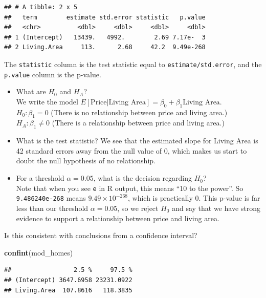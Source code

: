\documentclass[
]{book}
\newenvironment{Shaded}{\begin{snugshade}}{\end{snugshade}}
\newcommand{\FunctionTok}[1]{\textcolor[rgb]{0.13,0.29,0.53}{\textbf{#1}}}
\newcommand{\NormalTok}[1]{#1}
\begin{document}
\begin{verbatim}
## # A tibble: 2 x 5
##   term        estimate std.error statistic   p.value
##   <chr>          <dbl>     <dbl>     <dbl>     <dbl>
## 1 (Intercept)   13439.   4992.        2.69 7.17e-  3
## 2 Living.Area     113.      2.68     42.2  9.49e-268
\end{verbatim}

The \texttt{statistic} column is the test statistic equal to \texttt{estimate/std.error}, and the \texttt{p.value} column is the p-value.

\begin{itemize}
\item
  What are \(H_0\) and \(H_A\)?\\
  We write the model \(E[\text{Price}|\text{Living Area} ] = \beta_0 + \beta_1\text{Living Area}\).\\
  \(H_0: \beta_1 = 0\) (There is no relationship between price and living area.)\\
  \(H_A: \beta_1 \neq 0\) (There is a relationship between price and living area.)
\item
  What is the test statistic?
  We see that the estimated slope for Living Area is 42 standard errors away from the null value of 0, which makes us start to doubt the null hypothesis of no relationship.
\item
  For a threshold \(\alpha = 0.05\), what is the decision regarding \(H_0\)?\\
  Note that when you see \texttt{e} in R output, this means ``10 to the power''. So \texttt{9.486240e-268} means \(9.49 \times 10^{-268}\), which is practically 0. This p-value is far less than our threshold \(\alpha = 0.05\), so we reject \(H_0\) and say that we have strong evidence to support a relationship between price and living area.
\end{itemize}

Is this consistent with conclusions from a confidence interval?

\begin{Shaded}
\begin{Highlighting}[]
\FunctionTok{confint}\NormalTok{(mod\_homes)}
\end{Highlighting}
\end{Shaded}

\begin{verbatim}
##                 2.5 %     97.5 %
## (Intercept) 3647.6958 23231.0922
## Living.Area  107.8616   118.3835
\end{verbatim}
\end{document}
